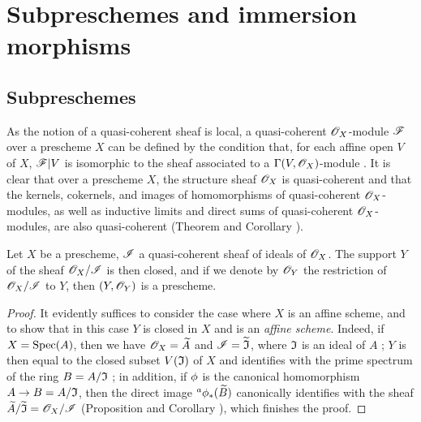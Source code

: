 \section{Subpreschemes and immersion morphisms}
\label{section-subpreschemes-and-immersion-morphisms}

\subsection{Subpreschemes}
\label{subsection-subpreschemes}

\begin{env}[4.1.1]
\label{1.4.1.1}
As the notion of a quasi-coherent sheaf  is local, a quasi-coherent $\mathscr{O}_X$-module $\mathscr{F}$ over a prescheme $X$ can be defined by the condition that, for each affine open $V$ of $X$, $\mathscr{F}|V$ is isomorphic to the sheaf associated to a $\Gamma(V,\mathscr{O}_X)$-module .
It is clear that over a prescheme $X$, the structure sheaf $\mathscr{O}_X$ is quasi-coherent and that the kernels, cokernels, and images of homomorphisms of quasi-coherent $\mathscr{O}_X$-modules, as well as inductive limits and direct sums of quasi-coherent $\mathscr{O}_X$-modules, are also quasi-coherent (Theorem  and Corollary ).
\end{env}

\begin{prop}[4.1.2]
\label{1.4.1.2}
Let $X$ be a prescheme, $\mathscr{I}$ a quasi-coherent sheaf of ideals of $\mathscr{O}_X$.
The support $Y$ of the sheaf $\mathscr{O}_X/\mathscr{I}$ is then closed, and if we denote by $\mathscr{O}_Y$ the restriction of $\mathscr{O}_X/\mathscr{I}$ to $Y$, then $(Y,\mathscr{O}_Y)$ is a prescheme.
\end{prop}

\begin{proof}
\label{proof-1.4.1.2}
It evidently suffices  to consider the case where $X$ is an affine scheme, and to show that in this case $Y$ is closed in $X$ and is an \emph{affine scheme}.
Indeed, if $X={\mathop{\mathrm{Spec}}\nolimits}(A)$, then we have $\mathscr{O}_X=\widetilde{A}$ and $\mathscr{I}=\widetilde{\mathfrak{I}}$, where $\mathfrak{I}$ is an ideal of $A$ ; $Y$ is then equal to the closed subset $V(\mathfrak{I})$ of $X$ and identifies with the prime spectrum of the ring $B=A/\mathfrak{I}$ ;
in addition, if $\phi$ is the canonical homomorphism $A\to B=A/\mathfrak{I}$, then the direct image ${}^a\phi_*(\widetilde{B})$ canonically identifies with the sheaf $\widetilde{A}/\widetilde{\mathfrak{I}}=\mathscr{O}_X/\mathscr{I}$ (Proposition  and Corollary ), which finishes the proof.
\end{proof}

